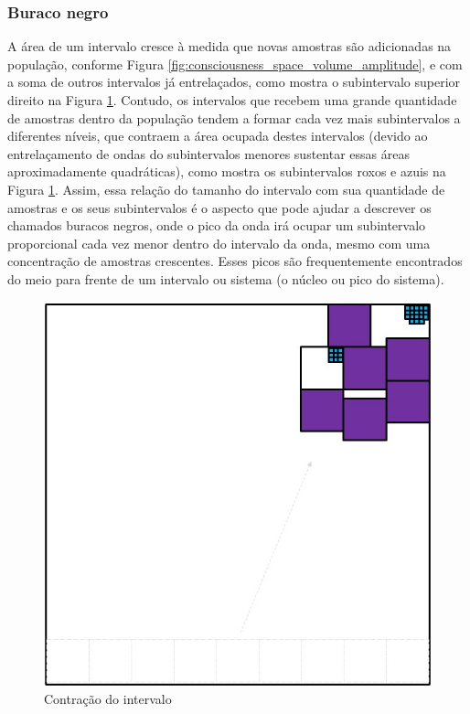 \subsubsection{Buraco negro}
A área de um intervalo cresce à medida que novas amostras são adicionadas na população, conforme Figura \ref{fig:consciousness_space_volume_amplitude}, e com a soma de outros intervalos já entrelaçados, como mostra o subintervalo superior direito na Figura \ref{fig:consciousness_interval_contraction}. Contudo, os intervalos que recebem uma grande quantidade de amostras dentro da população tendem a formar cada vez mais subintervalos a diferentes níveis, que contraem a área ocupada destes intervalos (devido ao entrelaçamento de ondas do subintervalos menores sustentar essas áreas aproximadamente quadráticas), como mostra os subintervalos roxos e azuis na Figura \ref{fig:consciousness_interval_contraction}. Assim, essa relação do tamanho do intervalo com sua quantidade de amostras e os seus subintervalos é o aspecto que pode ajudar a descrever os chamados buracos negros, onde o pico da onda irá ocupar um subintervalo proporcional cada vez menor dentro do intervalo da onda, mesmo com uma concentração de amostras crescentes. Esses picos são frequentemente encontrados do meio para frente de um intervalo ou sistema (o núcleo ou pico do sistema).
	\begin{figure}[H]
	\caption{Contração do intervalo}
	\label{fig:consciousness_interval_contraction}
	\centering
	\includegraphics[scale=.5]{sections/images/consciousness_interval_contraction.jpg}
	\end{figure}
	
